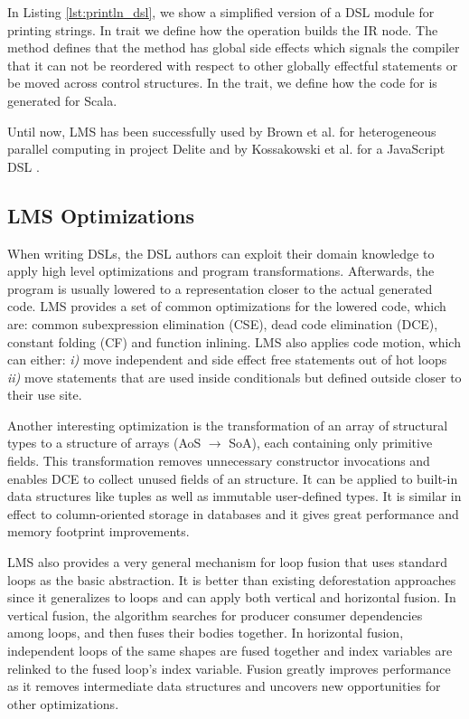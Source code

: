  
In Listing \ref{lst:println_dsl}, we show a simplified version of a DSL module
for printing strings. In trait  we define how the
 operation builds the IR node. The  method
defines that the  method has global side effects which signals the
compiler that it can not be reordered with respect to other globally effectful
statements or be moved across control structures. In the 
trait, we define how the code for  is generated for Scala.

Until now, LMS has been successfully used by Brown et al. for heterogeneous
parallel computing in project Delite \cite{brown_heterogeneous_2011, dsl11} and by
Kossakowski et al. for a JavaScript DSL \cite{greg}.

\subsection{LMS Optimizations}
\label{subsec:lms-optimizations}
When writing DSLs, the DSL authors can exploit their domain knowledge to apply
high level optimizations and program transformations. Afterwards, the program is
usually lowered to a representation closer to the actual generated code. LMS
provides a set of common optimizations for the lowered code, which are: common
subexpression elimination (CSE), dead code elimination (DCE), constant folding
(CF) and function inlining. LMS also applies code motion, which can either:
\emph{i)} move independent and side effect free statements out of hot loops
\emph{ii)} move statements that are used inside conditionals but defined
outside closer to their use site.

Another interesting optimization is the transformation of an array of structural
types to a structure of arrays (AoS $\rightarrow$ SoA), each containing only
primitive fields. This transformation removes unnecessary constructor
invocations and enables DCE to collect unused fields of an structure. It can be
applied to built-in data structures like tuples as well as immutable
user-defined types. It is similar in effect to column-oriented storage in
databases and it gives great performance and memory footprint improvements.

LMS also provides a very general mechanism for loop fusion that uses
standard loops as the basic abstraction. It is better than existing
deforestation approaches since it generalizes to loops and can apply both
vertical and horizontal fusion. In vertical fusion, the algorithm searches for
producer consumer dependencies among loops, and then fuses their bodies
together. In horizontal fusion, independent loops of the same shapes are fused
together and index variables are relinked to the fused loop's index variable.
Fusion greatly improves performance as it removes intermediate data structures
and uncovers new opportunities for other optimizations.

